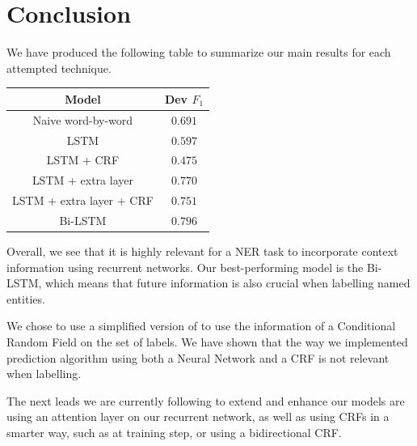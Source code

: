 \documentclass{article} %
\begin{document}
\section{Conclusion}

We have produced the following table to summarize our main results for each attempted technique.

\begin{center}
 \begin{tabular}{||c | c||}
 \hline
 Model  & Dev $F_1$ \\
 \hline\hline
 Naive word-by-word & $0.691$ \\
 \hline
 LSTM & $0.597$ \\
 \hline
 LSTM + CRF & $0.475$ \\
 \hline
 LSTM + extra layer & $0.770$ \\
 \hline
 LSTM + extra layer + CRF & $0.751$ \\
 \hline
 Bi-LSTM & $0.796$ \\ %
 \hline
\end{tabular}
\end{center}

Overall, we see that it is highly relevant for a NER task to incorporate context information using recurrent networks. Our best-performing model is the Bi-LSTM, which means that future information is also crucial when labelling named entities.

We chose to use a simplified version of \cite{lample2016neural} to use the information of a Conditional Random Field on the set of labels. We have shown that the way we implemented prediction algorithm using both a Neural Network and a CRF is not relevant when labelling.

The next leads we are currently following to extend and enhance our models are using an attention layer on our recurrent network, as well as using CRFs in a smarter way, such as at training step, or using a bidirectional CRF.


\newpage


\end{document}
